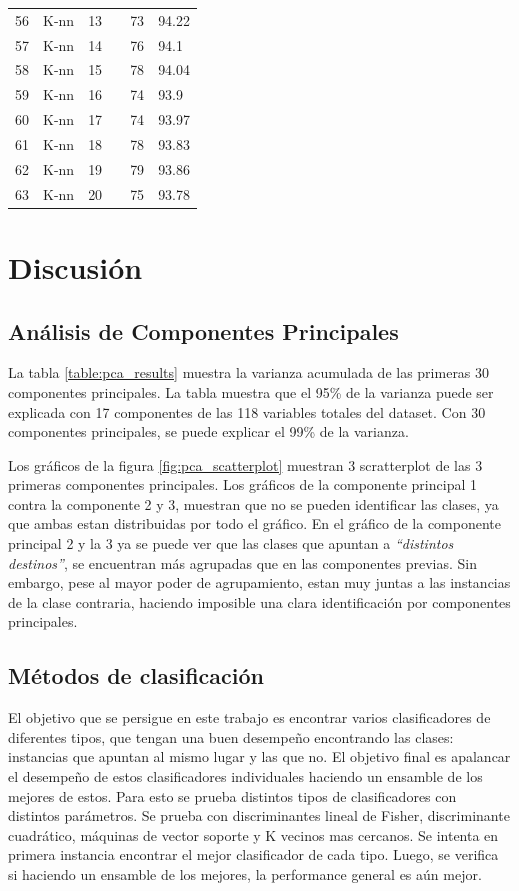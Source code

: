 \documentclass[journal]{IEEEtran}
\begin{document}
\begin{table}[!hb]
\begin{tabular}{l | l l l | l l}
	56	&	K-nn	&	13	&		&	73	&	94.22 \\
	57	&	K-nn	&	14	&		&	76	&	94.1 \\
	58	&	K-nn	&	15	&		&	78	&	94.04 \\
	59	&	K-nn	&	16	&		&	74	&	93.9 \\
	60	&	K-nn	&	17	&		&	74	&	93.97 \\
	61	&	K-nn	&	18	&		&	78	&	93.83 \\
	62	&	K-nn	&	19	&		&	79	&	93.86 \\
	63	&	K-nn	&	20	&		&	75	&	93.78 \\
\end{tabular}
\end{table}


\section{Discusión}
\subsection{Análisis de Componentes Principales}
La tabla \ref{table:pca_results} muestra la varianza acumulada de las
primeras 30 componentes principales. La tabla muestra que el 95\%
de la varianza puede ser explicada con 17 componentes de las 118 variables
totales del dataset. Con 30 componentes principales, se puede explicar
el 99\% de la varianza.

Los gráficos de la figura \ref{fig:pca_scatterplot} muestran 3 scratterplot de
las 3 primeras componentes principales. Los gráficos de la componente principal 1 
contra la componente 2 y 3, muestran que no se pueden identificar las clases, ya
que ambas estan distribuidas por todo el gráfico. En el gráfico de la
componente principal 2 y la 3 ya se puede ver que las clases que apuntan
a \textit{``distintos destinos''}, se encuentran más agrupadas que en las componentes
previas. Sin embargo, pese al mayor poder de agrupamiento, estan muy juntas a
las instancias de la clase contraria, haciendo imposible una clara identificación por
componentes principales.

\subsection{Métodos de clasificación}
El objetivo que se persigue en este trabajo es encontrar varios clasificadores
de diferentes tipos, que tengan una buen desempeño encontrando las clases:
instancias que apuntan al mismo lugar y las que no. El objetivo final es apalancar
el desempeño de estos clasificadores individuales haciendo un ensamble
de los mejores de estos. 
Para esto se prueba distintos tipos de clasificadores con distintos parámetros.
Se prueba con discriminantes lineal de Fisher, discriminante cuadrático,
máquinas de vector soporte y K vecinos mas cercanos. Se intenta en primera 
instancia encontrar el mejor clasificador de cada tipo. Luego, se verifica si
haciendo un ensamble de los mejores, la performance general es aún mejor.
\end{document}

